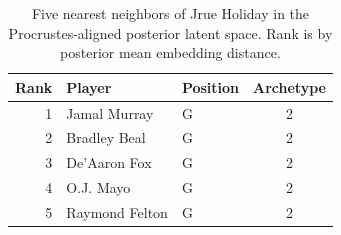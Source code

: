 \begin{table}[htbp]
  \centering\small
  \begin{tabular}{rllc}
    \toprule
    Rank & Player & Position & Archetype \\
    \midrule
    1 & Jamal Murray & G & 2 \\
    2 & Bradley Beal & G & 2 \\
    3 & De'Aaron Fox & G & 2 \\
    4 & O.J. Mayo & G & 2 \\
    5 & Raymond Felton & G & 2 \\
    \bottomrule
  \end{tabular}
  \caption{Five nearest neighbors of Jrue Holiday in the Procrustes-aligned posterior latent space. Rank is by posterior mean embedding distance.}
  \label{tab:Jrue_Holiday_neighbors}
\end{table}

